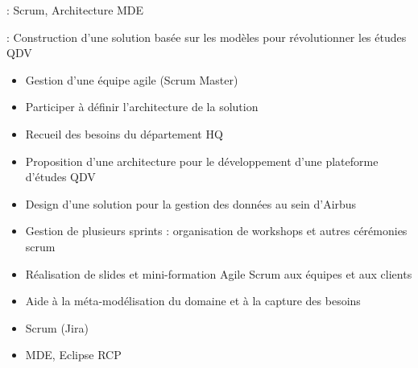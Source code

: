 
 : Scrum, Architecture MDE

 : Construction d'une solution basée sur les modèles pour révolutionner les études QDV 

\bigskip


\begin{itemize}
\item Gestion d'une équipe agile (Scrum Master)
\item Participer à définir l'architecture de la solution
\end{itemize} 


\begin{itemize}
\item Recueil des besoins du département HQ
\item Proposition d'une architecture pour le développement d'une plateforme d'études QDV
\item Design d'une solution pour la gestion des données au sein d'Airbus
\item Gestion de plusieurs sprints : organisation de workshops et autres cérémonies scrum
\item Réalisation de slides et mini-formation Agile Scrum aux équipes et aux clients
\item Aide à la méta-modélisation du domaine et à la capture des besoins
\end{itemize} 


\begin{itemize}
\item Scrum (Jira)
\item MDE, Eclipse RCP
\end{itemize}